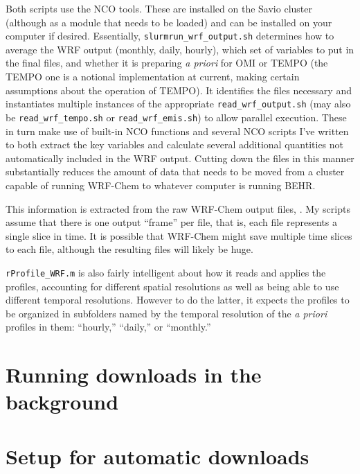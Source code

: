 \documentclass[12pt]{article}
\begin{document}
	Both scripts use the NCO tools. These are installed on the Savio cluster (although as a module that needs to be loaded) and can be installed on your computer if desired. Essentially, \lstinline$slurmrun_wrf_output.sh$ determines how to average the WRF output (monthly, daily, hourly), which set of variables to put in the final files, and whether it is preparing \emph{a priori} for OMI or TEMPO (the TEMPO one is a notional implementation at current, making certain assumptions about the operation of TEMPO). It identifies the files necessary and instantiates multiple instances of the appropriate \lstinline$read_wrf_output.sh$ (may also be \lstinline$read_wrf_tempo.sh$ or \lstinline$read_wrf_emis.sh$) to allow parallel execution.  These in turn make use of built-in NCO functions and several NCO scripts I've written to both extract the key variables and calculate several additional quantities not automatically included in the WRF output. Cutting down the files in this manner substantially reduces the amount of data that needs to be moved from a cluster capable of running WRF-Chem to whatever computer is running BEHR.
	
	This information is extracted from the raw WRF-Chem output files, . My scripts assume that there is one output ``frame'' per file, that is, each file represents a single slice in time. It is possible that WRF-Chem might save multiple time slices to each file, although the resulting files will likely be huge. 
	
	\lstinline$rProfile_WRF.m$ is also fairly intelligent about how it reads and applies the  profiles, accounting for different spatial resolutions as well as being able to use different temporal resolutions. However to do the latter, it expects the profiles to be organized in subfolders named by the temporal resolution of the \emph{a priori} profiles in them: ``hourly,'' ``daily,'' or ``monthly.''

\newpage
\label{thebib}




\newpage
\appendix
\appendixpage
\addappheadtotoc

\section{Running downloads in the background}

\section{Setup for automatic downloads} \label{app:autodl}
\end{document}
